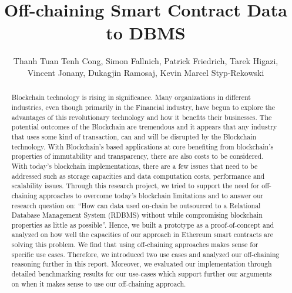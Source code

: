 \documentclass[a4paper]{article}
\title{Off-chaining Smart Contract Data to DBMS}
\author{Thanh Tuan Tenh Cong, 
Simon Fallnich,
Patrick Friedrich,
Tarek Higazi,\\
Vincent Jonany,
Dukagjin Ramosaj,
Kevin Marcel Styp-Rekowski}
\begin{document}
\maketitle

\begin{abstract}

Blockchain technology is rising in significance. Many organizations in different industries, even though primarily in the Financial industry, have begun to explore the advantages of this revolutionary technology and how it benefits their businesses. The potential outcomes of the Blockchain are tremendous and it appears that any industry that uses some kind of transaction, can and will be disrupted by the Blockchain technology. With Blockchain’s based applications at core benefiting from blockchain’s properties of immutability and transparency, there are also costs to be considered. With today’s blockchain implementations, there are a few issues that need to be addressed such as storage capacities and data computation costs, performance and scalability issues. Through this research project, we tried to support the need for off-chaining approaches to overcome today’s blockchain limitations and to answer our research question on: “How can data used on-chain be outsourced to a Relational Database Management System (RDBMS) without while compromising blockchain properties as little as possible”. Hence, we built a prototype as a proof-of-concept and analyzed on how well the capacities of our approach in Ethereum smart contracts are solving this problem. We find that using off-chaining approaches makes sense for specific use cases. Therefore, we introduced two use cases and analyzed our off-chaining reasoning further in this report. Moreover, we evaluated our implementation through detailed benchmarking results for our use-cases which support further our arguments on when it makes sense to use our off-chaining approach.


\end{abstract}
\newpage
\tableofcontents
\newpage











\newpage


\end{document}
